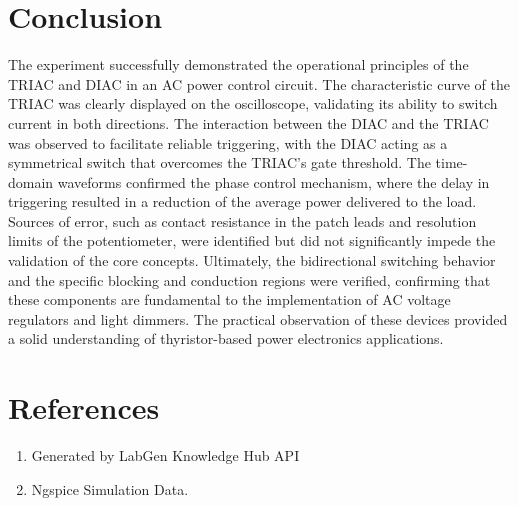 \documentclass[12pt,a4paper]{article}
\begin{document}
\section{Conclusion}
The experiment successfully demonstrated the operational principles of the TRIAC and DIAC in an AC power control circuit. The characteristic curve of the TRIAC was clearly displayed on the oscilloscope, validating its ability to switch current in both directions. The interaction between the DIAC and the TRIAC was observed to facilitate reliable triggering, with the DIAC acting as a symmetrical switch that overcomes the TRIAC's gate threshold. The time-domain waveforms confirmed the phase control mechanism, where the delay in triggering resulted in a reduction of the average power delivered to the load. Sources of error, such as contact resistance in the patch leads and resolution limits of the potentiometer, were identified but did not significantly impede the validation of the core concepts. Ultimately, the bidirectional switching behavior and the specific blocking and conduction regions were verified, confirming that these components are fundamental to the implementation of AC voltage regulators and light dimmers. The practical observation of these devices provided a solid understanding of thyristor-based power electronics applications.

\section{References}
\begin{enumerate}

    \item Generated by LabGen Knowledge Hub API

    \item Ngspice Simulation Data.

\end{enumerate}
\end{document}
